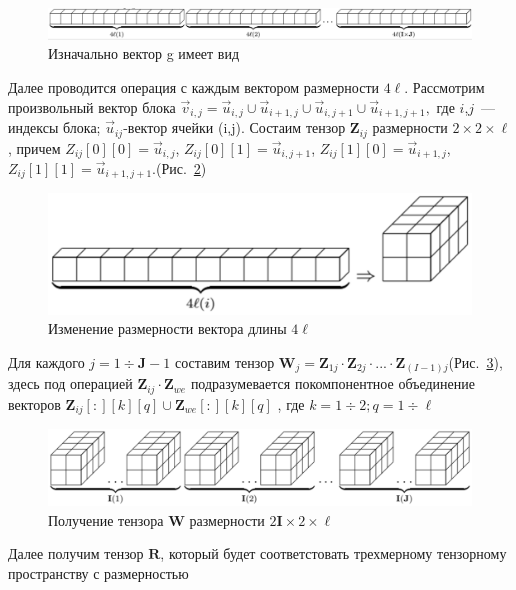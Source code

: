 \documentclass[12pt,twoside]{article}
\begin{document}
\begin{center}
	
	\begin{figure}[H]
		\includegraphics[width=\linewidth]{1}
		\caption{Изначально вектор g имеет вид}
		\label{ris:1}
	\end{figure}
\end{center}
Далее проводится операция с каждым вектором размерности $4 \ell$. Рассмотрим произвольный вектор блока $\vec{v}_{i,j} = \vec{u}_{i,j}\cup\vec{u}_{i+1,j}\cup\vec{u}_{i,j+1}
\cup\vec{u}_{i+1,j+1},$ где $i$,$j$~--- индексы блока; $\vec{u}_{ij}$-вектор ячейки (i,j). 
Состаим тензор $\textbf{Z}_{ij}$ 
размерности $2\times 2 \times \ell$, 
причем $Z_{ij}[0][0]=\vec{u}_{i,j}$, $Z_{ij}[0][1]=\vec{u}_{i,j+1}$, $Z_{ij}[1][0]=\vec{u}_{i+1,j}$, $Z_{ij}[1][1]=\vec{u}_{i+1,j+1}$.(Рис.~\ref{ris:2})
\begin{center}
	\begin{figure}[H]
		\includegraphics[width=0.6\linewidth]{2}
		\caption{Изменение размерности вектора длины $4 \ell$ }
		\label{ris:2}
	\end{figure}
\end{center}
Для каждого $j=1\div \textbf{J}-1$ составим тензор $\textbf{W}_j=\textbf{Z}_{1j}\cdot\textbf{Z}_{2j}\cdot ... \cdot \textbf{Z}_{(I-1)j} $(Рис.~\ref{ris:3}), здесь под операцией $\textbf{Z}_{ij} \cdot \textbf{Z}_{we}$ подразумевается покомпонентное объединение векторов $\textbf{Z}_{ij}[:][k][q] \cup \textbf{Z}_{we}[:][k][q]$ , где $k=1\div 2; q=1\div \ell$
\begin{center}
	\begin{figure}[H]
		\includegraphics[width=0.7\linewidth]{3}
		\caption{Получение тензора $\textbf{W}$ размерности $2\textbf{I}\times 2 \times \ell$ }
		\label{ris:3}
	\end{figure}
\end{center}
Далее получим тензор $\textbf{R}$, который будет соответстовать трехмерному тензорному пространству с размерностью  
\end{document}

